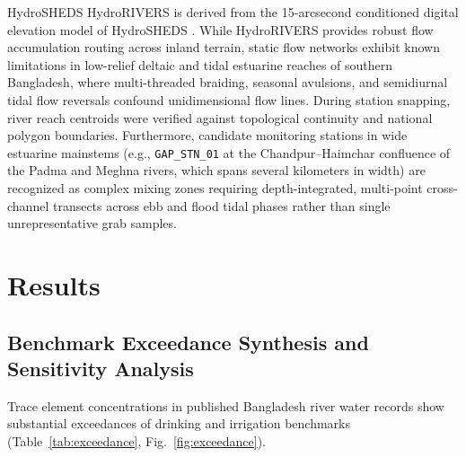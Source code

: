 \documentclass[authoryear,preprint,12pt]{elsarticle}
\begin{document}
HydroSHEDS HydroRIVERS is derived from the 15-arcsecond conditioned digital elevation model of HydroSHEDS \citep{Lehner2013}. While HydroRIVERS provides robust flow accumulation routing across inland terrain, static flow networks exhibit known limitations in low-relief deltaic and tidal estuarine reaches of southern Bangladesh, where multi-threaded braiding, seasonal avulsions, and semidiurnal tidal flow reversals confound unidimensional flow lines. During station snapping, river reach centroids were verified against topological continuity and national polygon boundaries. Furthermore, candidate monitoring stations in wide estuarine mainstems (e.g., \texttt{GAP\_STN\_01} at the Chandpur--Haimchar confluence of the Padma and Meghna rivers, which spans several kilometers in width) are recognized as complex mixing zones requiring depth-integrated, multi-point cross-channel transects across ebb and flood tidal phases rather than single unrepresentative grab samples.

\section{Results}

\subsection{Benchmark Exceedance Synthesis and Sensitivity Analysis}
Trace element concentrations in published Bangladesh river water records show substantial exceedances of drinking and irrigation benchmarks (Table~\ref{tab:exceedance}, Fig.~\ref{fig:exceedance}).
\end{document}
